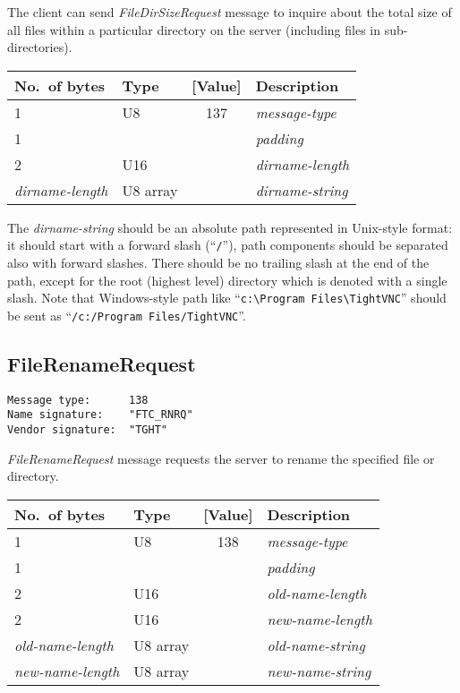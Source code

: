 \documentclass[a4paper]{article}
\newcommand{\typestr}[1]{\textit{#1}}
\begin{document}
The client can send \typestr{FileDirSizeRequest} message to inquire
about the total size of all files within a particular directory on the
server (including files in sub-directories).

\begin{tabular}{l|lc|l} \hline
No.\ of bytes & Type & [Value] & Description \\ \hline
1 & U8  & 137 & \typestr{message-type} \\
1 &     &     & \typestr{padding} \\
2 & U16 &     & \typestr{dirname-length} \\
\typestr{dirname-length} & U8 array & & \typestr{dirname-string} \\
\hline\end{tabular}

The \typestr{dirname-string} should be an absolute path represented in
Unix-style format: it should start with a forward slash
(``\verb|/|''), path components should be separated also with forward
slashes. There should be no trailing slash at the end of the path,
except for the root (highest level) directory which is denoted with a
single slash. Note that Windows-style path like
``\verb|c:\Program Files\TightVNC|'' should be sent as
``\verb|/c:/Program Files/TightVNC|''.

\newpage
\subsection{FileRenameRequest}
\begin{verbatim}
Message type:      138
Name signature:    "FTC_RNRQ"
Vendor signature:  "TGHT"
\end{verbatim}

\typestr{FileRenameRequest} message requests the server to rename the
specified file or directory.

\begin{tabular}{l|lc|l} \hline
No.\ of bytes & Type & [Value] & Description \\ \hline
1 & U8  & 138 & \typestr{message-type} \\
1 &     &     & \typestr{padding} \\
2 & U16 &     & \typestr{old-name-length} \\
2 & U16 &     & \typestr{new-name-length} \\
\typestr{old-name-length} & U8 array & & \typestr{old-name-string} \\
\typestr{new-name-length} & U8 array & & \typestr{new-name-string} \\
\hline\end{tabular}
\end{document}
